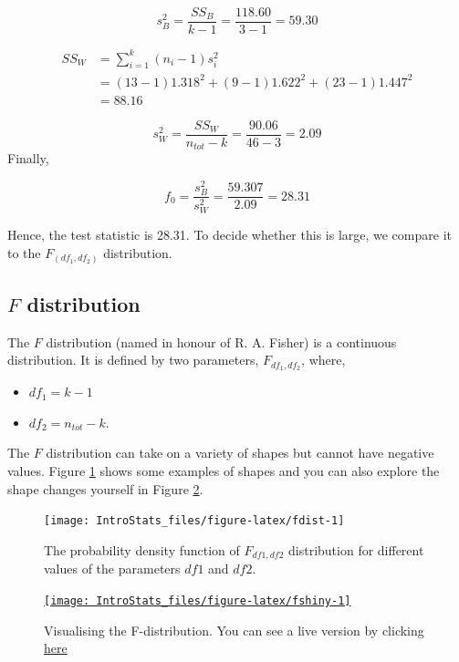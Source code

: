 \documentclass[
  oneside]{krantz}
\providecommand{\tightlist}{%
  \setlength{\itemsep}{0pt}\setlength{\parskip}{0pt}}
\begin{document}
\[s^2_B = \frac{SS_B}{k-1} = \frac{118.60}{3-1} = 59.30 \]

\begin{equation}
\begin{split}
SS_W & = \sum_{i=1}^{k}(n_i-1)s_i^2 \\
& = (13-1)1.318^2 + (9-1)1.622^2 + (23-1)1.447^2 \\
& = 88.16
\end{split}
\end{equation}

\[s^2_W = \frac{SS_W}{n_{tot}-k} = \frac{90.06}{46 - 3} = 2.09\]
Finally,

\[f_0 = \frac{s^2_B}{s^2_W} = \frac{59.307}{2.09} = 28.31\]

Hence, the test statistic is 28.31. To decide whether this is large, we compare it to the \(F_{(df_1,df_2)}\) distribution.

\hypertarget{f-distribution}{%
\subsection{\texorpdfstring{\(F\) distribution}{F distribution}}\label{f-distribution}}

The \(F\) distribution (named in honour of R. A. Fisher) is a continuous distribution. It is defined by two parameters, \(F_{df_1,df_2}\), where,

\begin{itemize}
\tightlist
\item
  \(df_1 = k - 1\)
\item
  \(df_2 = n_{tot} - k\).
\end{itemize}

The \(F\) distribution can take on a variety of shapes but cannot have negative values. Figure \ref{fig:fdist} shows some examples of shapes and you can also explore the shape changes yourself in Figure \ref{fig:fshiny}.

\begin{figure}

{\centering \texttt{[image: IntroStats\_files/figure-latex/fdist-1]} 

}

\caption{The probability density function of $F_{df1,df2}$ distribution for different values of the parameters $df1$ and $df2$.}\label{fig:fdist}
\end{figure}



\begin{figure}

{\centering \href{https://moniquemackenzie.shinyapps.io/IntroStats_Fdistribution/}{\texttt{[image: IntroStats\_files/figure-latex/fshiny-1]} }

}

\caption{Visualising the F-distribution. You can see a live version by clicking \href{https://moniquemackenzie.shinyapps.io/IntroStats_Fdistribution/}{here}}\label{fig:fshiny}
\end{figure}
\end{document}
